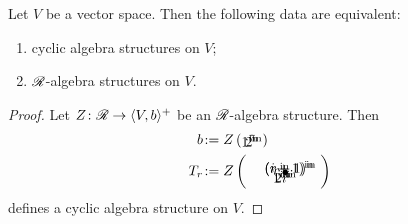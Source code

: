 \begin{theorem}\label{thm:gc-cyc}
  Let $V$ be a vector space. Then the following data are equivalent:
  \begin{enumerate}
  \item cyclic algebra structures on $V$;
  \item $\mathscr{R}_{}$-algebra structures on $V$.
  \end{enumerate}
\end{theorem}
\begin{proof} Let $Z\colon\mathscr{R}_{}\to\langle V,b\rangle^+$ be an $\mathscr{R}_{}$-algebra structure.
  Then
  \begin{align*}
    b &\joinrel:= Z\left(\xy*!LC\xybox{%
        \vloop~{(0,0.5)}{(1,0.5)}{(0,-0.5)}{(1,-0.5)},(0,-0.7)*{1^{\textrm{in}}}%
        ,(1,-0.7)*{2^{\textrm{in}}}}
      \endxy\right)
    \\
    T_r &\joinrel:= Z\left(\xy*!LC\xybox{
        (0,1)*{\bullet};%
        (-1,0)*+{1^{\textrm{in}}}**\dir{-},(-0.5,0)*+{2^{\textrm{in}}}**\dir{-},%
        (0,0.5)*+{\ldots},(1,0)*+{i^{\textrm{in}}}**\dir{-},%
        (-1,2)*+{r^{\textrm{in}}}**\dir{-}%
        ,(-0.5,2)*+{\ \ \ (r-1)^{\textrm{in}}}**\dir{-},%
        (0,1.5)*+{\ldots},(1,2)*+{(i+1)^{\textrm{in}}}**\dir{-},%
        }\endxy\right) 
  \end{align*}
  defines a cyclic algebra structure on $V$.
  

\end{proof}
